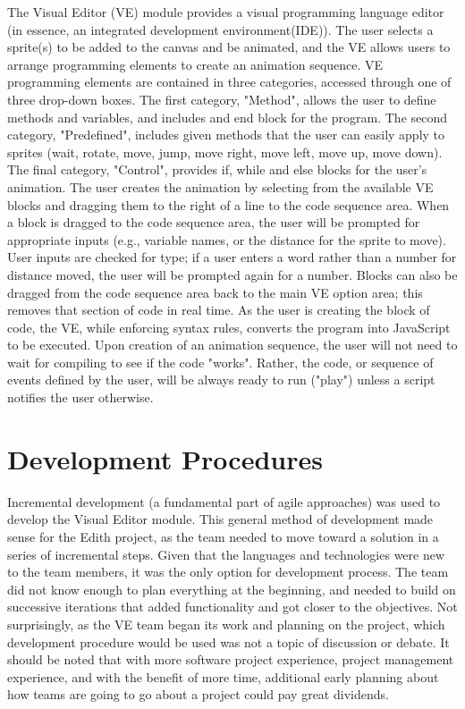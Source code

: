 \documentclass[a4paper]{article}
\begin{document}
The Visual Editor (VE) module provides a visual programming language editor (in essence, an integrated development environment(IDE)).  The user selects a sprite(s) to be added to the canvas and be animated, and the VE allows users to arrange programming elements to create an animation sequence.  VE programming elements are contained in three categories, accessed through one of three drop-down boxes.  The first category, "Method", allows the user to define methods and variables, and includes and end block for the program.  The second category, "Predefined", includes given methods that the user can easily apply to sprites (wait, rotate, move, jump, move right, move left, move up, move down).  The final category, "Control", provides if, while and else blocks for the user's animation.  The user creates the animation by selecting from the available VE blocks and dragging them to the right of a line to the code sequence area.  When a block is dragged to the code sequence area, the user will be prompted for appropriate inputs (e.g., variable names, or the distance for the sprite to move).  User inputs are checked for type; if a user enters a word rather than a number for distance moved, the user will be prompted again for a number.  Blocks can also be dragged from the code sequence area back to the main VE option area; this removes that section of code in real time. As the user is creating the block of code, the VE, while enforcing syntax rules, converts the program into JavaScript to be executed.  Upon creation of an animation sequence, the user will not need to  wait for compiling to see if the code "works". Rather, the code, or sequence of events defined by the user, will be always ready to run ("play") unless a script notifies the user otherwise.






\section{Development Procedures}

Incremental development (a fundamental part of agile approaches) was used to develop the Visual Editor module.  This general method of development made sense for the Edith project, as the team needed to move toward a solution in a series of incremental steps.  Given that the languages and technologies were new to the team members, it was the only option for development process.  The team did not know enough to plan everything at the beginning, and needed to build on successive iterations that added functionality and got closer to the objectives.  Not surprisingly, as the VE team began its work and planning on the project, which development procedure would be used was not a topic of discussion or debate.  It should be noted that with more software project experience, project management experience, and with the benefit of more time, additional early planning about how teams are going to go about a project could pay great dividends.    
\end{document}
